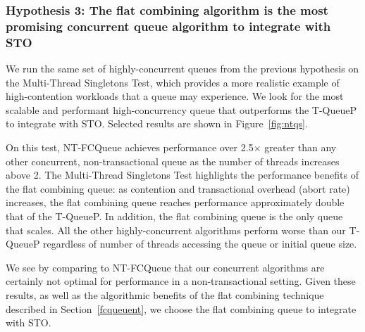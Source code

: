 \vspace{12pt}
\noindent{}

\subsubsection{Hypothesis 3: The flat combining algorithm is the most promising concurrent queue algorithm to integrate with STO}
\label{eval:hypo3}

We run the same set of highly-concurrent queues from the previous hypothesis on the Multi-Thread Singletons Test, which provides a more realistic example of high-contention workloads that a queue may experience. We look for the most scalable and performant high-concurrency queue that outperforms the T-QueueP to integrate with STO. Selected results are shown in Figure~\ref{fig:ntqs}.

On this test, NT-FCQueue achieves performance over 2.5$\times$ greater than any other concurrent, non-transactional queue as the number of threads increases above 2. The Multi-Thread Singletons Test highlights the performance benefits of the flat combining queue: as contention and transactional overhead (abort rate) increases, the flat combining queue reaches performance approximately double that of the T-QueueP. In addition, the flat combining queue is the only queue that scales. All the other highly-concurrent algorithms perform worse than our T-QueueP regardless of number of threads accessing the queue or initial queue size.

We see by comparing to NT-FCQueue that our concurrent algorithms are certainly not optimal for performance in a non-transactional setting.
Given these results, as well as the algorithmic benefits of the flat combining technique described in Section~\ref{fcqueuent}, we choose the flat combining queue to integrate with STO.

\vspace{12pt}
\noindent{}

